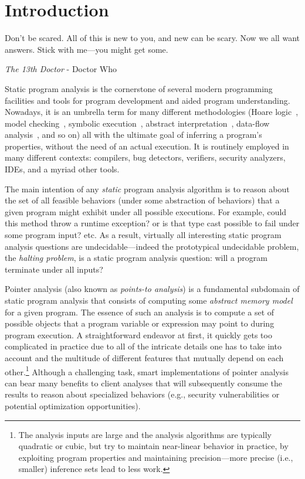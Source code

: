 \chapter{Introduction}
\label{chapter:intro}
\epigraph{Don’t be scared. All of this is new to you, and new can be scary. Now we all want answers. Stick with me---you might get some.}{\textit{The 13th Doctor} - Doctor Who}

Static program analysis is the cornerstone of several modern programming facilities and tools for program development and aided program understanding. Nowadays, it is an umbrella term for many different methodologies (Hoare logic~\cite{article:1969:Hoare,sam:1967:Floyd,lics:2002:Reynolds,csl:2001:OHearn}, model checking~\cite{icalp:1980:Emerson,lop:1981:Clarke,toplas:1986:Clarke,isp:1982:Queille}, symbolic execution~\cite{article:1976:King,article:1977:Howden,icas:2010:Pasareanu,article:1975:Boyer}, abstract interpretation~\cite{popl:1977:Cousot,article:1992:Cousot-LP,article:1992:Cousot-LC}, data-flow analysis~\cite{popl:1973:Kildall,book:2009:Khedker,book:1997:Muchnick,article:1977:Kam,popl:1995:Reps,book:1981:Sharir}, and so on) all with the ultimate goal of inferring a program's properties, without the need of an actual execution. It is routinely employed in many different contexts: compilers, bug detectors, verifiers, security analyzers, IDEs, and a myriad other tools.

The main intention of any \emph{static} program analysis algorithm is to reason about the set of all feasible behaviors (under some abstraction of behaviors) that a given program might exhibit under all possible executions. For example, could this method throw a runtime exception? or is that type cast possible to fail under some program input? etc. As a result, virtually all interesting static program analysis questions are undecidable---indeed the prototypical undecidable problem, the \emph{halting problem}, is a static program analysis question: will a program terminate under all inputs?

Pointer analysis (also known as \emph{points-to analysis}) is a fundamental subdomain of static program analysis that consists of computing some \emph{abstract memory model} for a given program. The essence of such an analysis is to compute a set of possible objects that a program variable or expression may point to during program execution. A straightforward endeavor at first, it quickly gets too complicated in practice due to all of the intricate details one has to take into account and the multitude of different features that mutually depend on each other.\footnote{The analysis inputs are large and the analysis algorithms are typically quadratic or cubic, but try to maintain near-linear behavior in practice, by exploiting program properties and maintaining precision---more precise (i.e., smaller) inference sets lead to less work.} Although a challenging task, smart implementations of pointer analysis can bear many benefits to client analyses that will subsequently consume the results to reason about specialized behaviors (e.g., security vulnerabilities or potential optimization opportunities).

